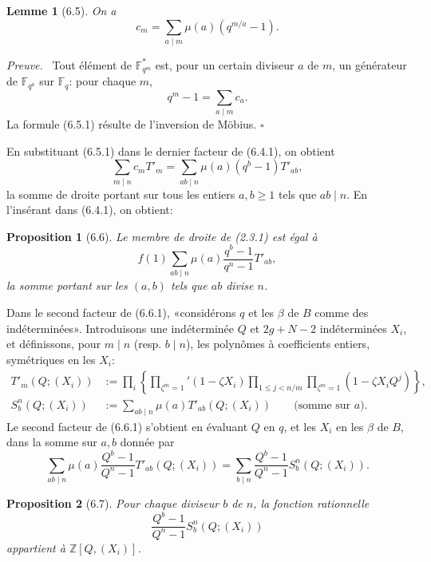 \documentclass[10pt]{article}
\newcommand{\Fq}{\mathbb F_q}
\newcommand{\Fb}{\mathbb F}
\newcommand{\Z}{\mathbb Z}
\theoremstyle{deligne}
\newtheorem*{proposition*}{Proposition}
\newtheorem*{lemma*}{Lemme}
\newenvironment{proofdel}[1][Preuve.]{\textit{#1}\ }{\hfill$\square$}
\begin{document}
\begin{lemma*}[6.5]
On a
\begin{equation}\tag{6.5.1}
c_m=\sum_{a\mid m}\mu(a)(q^{m/a}-1).
\end{equation}
\end{lemma*}
\begin{proofdel}
Tout élément de $\Fb_{q^m}^*$ est, pour un certain diviseur $a$ de $m$, un générateur de $\Fb_{q^a}$ sur $\Fq$: pour chaque $m$,
\[
q^m-1=\sum_{a\mid m}c_a.
\]
La formule (6.5.1) résulte de l'inversion de Möbius.
\end{proofdel}

En substituant (6.5.1) dans le dernier facteur de (6.4.1), on obtient
\begin{equation}\tag{6.5.2}
\sum_{m\mid n}c_mT'_m=\sum_{ab\mid n}\mu(a)(q^b-1)T'_{ab},
\end{equation}
la somme de droite portant sur tous les entiers $a,b\ge1$ tels que $ab\mid n$. En l'insérant dans (6.4.1), on obtient:

\begin{proposition*}[6.6]
Le membre de droite de (2.3.1) est égal à
\begin{equation}\tag{6.6.1}
f(1)\sum_{ab\mid n}\mu(a)\frac{q^b-1}{q^n-1}T'_{ab},
\end{equation}
la somme portant sur les $(a,b)$ tels que $ab$ divise $n$.
\end{proposition*}

Dans le second facteur de (6.6.1), «considérons $q$ et les $\beta$ de $B$ comme des indéterminées». Introduisons une indéterminée $Q$ et $2g+N-2$ indéterminées $X_i$, et définissons, pour $m\mid n$ (resp. $b\mid n$), les polynômes à coefficients entiers, symétriques en les $X_i$:
\begin{align}
T'_m(Q;(X_i))&:=\prod_i\left\{\prod_{\zeta^m=1}'(1-\zeta X_i)\prod_{1\le j<n/m}\prod_{\zeta^m=1}(1-\zeta X_iQ^j)\right\},\tag{6.6.2}\\
S_b^n(Q;(X_i))&:=\sum_{ab\mid n}\mu(a)T'_{ab}(Q;(X_i))\qquad\text{(somme sur $a$).}\tag{6.6.3}
\end{align}
Le second facteur de (6.6.1) s'obtient en évaluant $Q$ en $q$, et les $X_i$ en les $\beta$ de $B$, dans la somme sur $a,b$ donnée par
\begin{equation}\tag{6.6.4}
\sum_{ab\mid n}\mu(a)\frac{Q^b-1}{Q^n-1}T'_{ab}(Q;(X_i))
=\sum_{b\mid n}\frac{Q^b-1}{Q^n-1}S_b^n(Q;(X_i)).
\end{equation}

\begin{proposition*}[6.7]
Pour chaque diviseur $b$ de $n$, la fonction rationnelle
\[
\frac{Q^b-1}{Q^n-1}S_b^n(Q;(X_i))
\]
appartient à $\Z[Q,(X_i)]$.
\end{proposition*}
\end{document}
